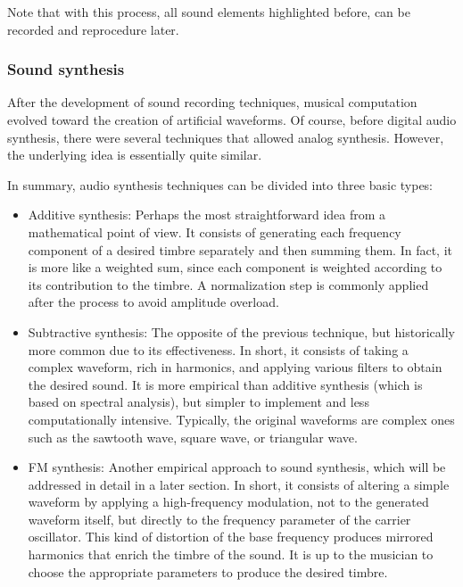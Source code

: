 \documentclass[sigconf,natbib=false]{acmart}
\begin{document}
Note that with this process, all sound elements highlighted before, can be recorded and reprocedure later.

\subsubsection{Sound synthesis}

After the development of sound recording techniques, musical computation evolved toward the creation of artificial waveforms. Of course, before digital audio synthesis, there were several techniques that allowed analog synthesis. However, the underlying idea is essentially quite similar.

In summary, audio synthesis techniques can be divided into three basic types:

\begin{itemize}
\item Additive synthesis: Perhaps the most straightforward idea from a mathematical point of view. It consists of generating each frequency component of a desired timbre separately and then summing them. In fact, it is more like a weighted sum, since each component is weighted according to its contribution to the timbre. A normalization step is commonly applied after the process to avoid amplitude overload.

\item Subtractive synthesis: The opposite of the previous technique, but historically more common due to its effectiveness. In short, it consists of taking a complex waveform, rich in harmonics, and applying various filters to obtain the desired sound. It is more empirical than additive synthesis (which is based on spectral analysis), but simpler to implement and less computationally intensive. Typically, the original waveforms are complex ones such as the sawtooth wave, square wave, or triangular wave.

\item FM synthesis: Another empirical approach to sound synthesis, which will be addressed in detail in a later section. In short, it consists of altering a simple waveform by applying a high-frequency modulation, not to the generated waveform itself, but directly to the frequency parameter of the carrier oscillator. This kind of distortion of the base frequency produces mirrored harmonics that enrich the timbre of the sound. It is up to the musician to choose the appropriate parameters to produce the desired timbre.
\end{itemize}
\end{document}
